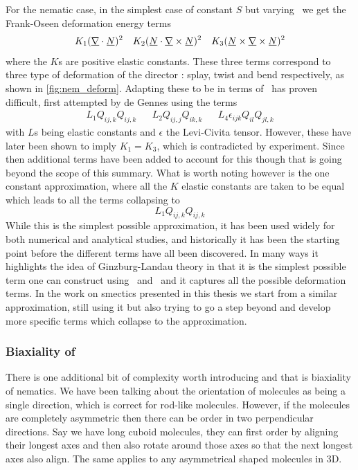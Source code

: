 \documentclass[12pt]{article}
\newcommand{\suf}[2]{\stackunder[1pt]{\ensuremath{#1}}{\rule{\widthof{\ensuremath{#2}}*\real{0.9}}{.1ex}}}
\newcommand{\duf}[2]{\stackunder[1pt]{\suf{\ensuremath{#1}}{#2}}{\rule{\widthof{\ensuremath{#2}}*\real{0.9}}{.1ex}}}
\newcommand{\su}[1]{\suf{#1}{#1}}
\newcommand{\du}[1]{\duf{#1}{#1}}
\newcommand{\mgrad}{\suf{\nabla}{K}}
\newcommand{\QQ}{\du{Q}}
\newcommand{\NN}{\su{N}}
\begin{document}
For the nematic case, in the simplest case of constant $S$ but varying \NN\ we get the Frank-Oseen deformation energy terms\cite{brayTheoryPhaseOrdering1993,frankLiquidCrystalsTheory1958,gennesPhysicsLiquidCrystals1995}
\begin{align}
    K_1 (\mgrad \cdot \su{N})^2 && K_2 (\su{N} \cdot \mgrad \times \su{N})^2 && K_3 (\su{N} \times \mgrad \times \su{N})^2
\end{align}
where the $K$s are positive elastic constants.
These three terms correspond to three type of deformation of the director \NN: splay, twist and bend respectively, as shown in \cref{fig:nem_deform}.
Adapting these to be in terms of \QQ\ has proven difficult, first attempted by de Gennes\cite{gennesPhysicsLiquidCrystals1995} using the terms
\begin{align}
    L_1Q_{ij,k}Q_{ij,k} && L_2Q_{ij,j}Q_{ik,k} && L_4\epsilon_{ijk}Q_{il}Q_{jl,k}
\end{align}
with $L$s being elastic constants and $\epsilon$ the Levi-Civita tensor.
However, these have later been shown to imply $K_1 = K_3$\cite{lubenskyMolecularDescriptionNematic1970}, which is contradicted by experiment.
Since then additional terms have been added to account for this\cite{longaExtensionLandauGinzburgdeGennes1987} though that is going beyond the scope of this summary.
What is worth noting however is the one constant approximation, where all the $K$ elastic constants are taken to be equal which leads to all the terms collapsing to
\begin{equation}
    L_1 Q_{ij,k}Q_{ij,k}
\end{equation}
While this is the simplest possible approximation, it has been used widely for both numerical and analytical studies, and historically it has been the starting point before the different terms have all been discovered.
In many ways it highlights the idea of Ginzburg-Landau theory in that it is the simplest possible term one can construct using \QQ\ and \mgrad\ and it captures all the possible deformation terms.
In the work on smectics presented in this thesis we start from a similar approximation, still using it but also trying to go a step beyond and develop more specific terms which collapse to the approximation.


\subsubsection{Biaxiality of \QQ}
There is one additional bit of complexity worth introducing and that is biaxiality of nematics.
We have been talking about the orientation of molecules as being a single direction, which is correct for rod-like molecules.
However, if the molecules are completely asymmetric then there can be order in two perpendicular directions.
Say we have long cuboid molecules, they can first order by aligning their longest axes and then also rotate around those axes so that the next longest axes also align.
The same applies to any asymmetrical shaped molecules in 3D.
\end{document}
